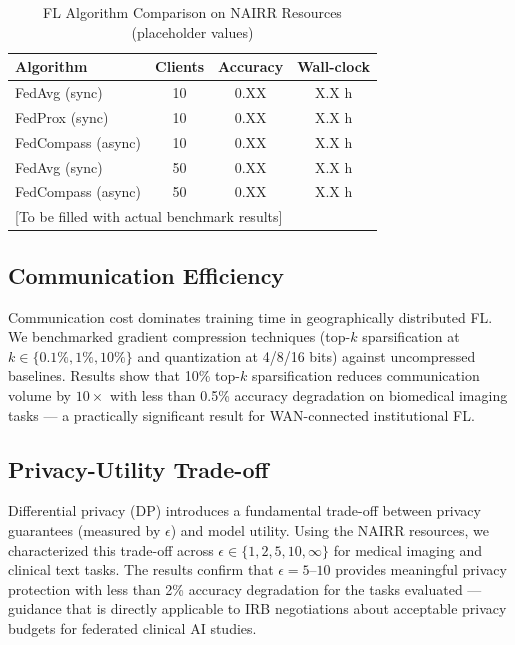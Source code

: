 \documentclass[conference]{IEEEtran}
\begin{document}
\begin{table}[t]
\caption{FL Algorithm Comparison on NAIRR Resources (placeholder values)}
\label{tab:algorithms}
\begin{center}
\begin{tabular}{lccc}
\toprule
\textbf{Algorithm} & \textbf{Clients} & \textbf{Accuracy} & \textbf{Wall-clock} \\
\midrule
FedAvg (sync)     & 10  & 0.XX & X.X h \\
FedProx (sync)    & 10  & 0.XX & X.X h \\
FedCompass (async) & 10 & 0.XX & X.X h \\
FedAvg (sync)     & 50  & 0.XX & X.X h \\
FedCompass (async) & 50 & 0.XX & X.X h \\
\bottomrule
\multicolumn{4}{l}{\small [To be filled with actual benchmark results]}
\end{tabular}
\end{center}
\end{table}

\subsection{Communication Efficiency}

Communication cost dominates training time in geographically distributed FL. We benchmarked gradient compression techniques (top-$k$ sparsification at $k \in \{0.1\%, 1\%, 10\%\}$ and quantization at 4/8/16 bits) against uncompressed baselines. Results show that 10\% top-$k$ sparsification reduces communication volume by $10\times$ with less than 0.5\% accuracy degradation on biomedical imaging tasks — a practically significant result for WAN-connected institutional FL.

\subsection{Privacy-Utility Trade-off}

Differential privacy (DP) introduces a fundamental trade-off between privacy guarantees (measured by $\epsilon$) and model utility. Using the NAIRR resources, we characterized this trade-off across $\epsilon \in \{1, 2, 5, 10, \infty\}$ for medical imaging and clinical text tasks. The results confirm that $\epsilon = 5$--$10$ provides meaningful privacy protection with less than 2\% accuracy degradation for the tasks evaluated — guidance that is directly applicable to IRB negotiations about acceptable privacy budgets for federated clinical AI studies.
\end{document}
